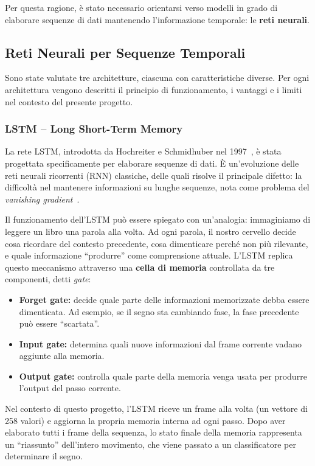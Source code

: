 Per questa ragione, è stato necessario orientarsi verso modelli in grado di elaborare sequenze di dati mantenendo l'informazione temporale: le \textbf{reti neurali}.

\subsection{Reti Neurali per Sequenze Temporali}

Sono state valutate tre architetture, ciascuna con caratteristiche diverse. Per ogni architettura vengono descritti il principio di funzionamento, i vantaggi e i limiti nel contesto del presente progetto.

\subsubsection{LSTM -- Long Short-Term Memory}

La rete LSTM, introdotta da Hochreiter e Schmidhuber nel 1997~\cite{hochreiter1997lstm}, è stata progettata specificamente per elaborare sequenze di dati. È un'evoluzione delle reti neurali ricorrenti (RNN) classiche, delle quali risolve il principale difetto: la difficoltà nel mantenere informazioni su lunghe sequenze, nota come problema del \textit{vanishing gradient}~\cite{lecun2015deeplearning}.

Il funzionamento dell'LSTM può essere spiegato con un'analogia: immaginiamo di leggere un libro una parola alla volta. Ad ogni parola, il nostro cervello decide cosa ricordare del contesto precedente, cosa dimenticare perché non più rilevante, e quale informazione ``produrre'' come comprensione attuale. L'LSTM replica questo meccanismo attraverso una \textbf{cella di memoria} controllata da tre componenti, detti \textit{gate}:

\begin{itemize}
    \item \textbf{Forget gate:} decide quale parte delle informazioni memorizzate debba essere dimenticata. Ad esempio, se il segno sta cambiando fase, la fase precedente può essere ``scartata''.
    \item \textbf{Input gate:} determina quali nuove informazioni dal frame corrente vadano aggiunte alla memoria.
    \item \textbf{Output gate:} controlla quale parte della memoria venga usata per produrre l'output del passo corrente.
\end{itemize}

Nel contesto di questo progetto, l'LSTM riceve un frame alla volta (un vettore di 258 valori) e aggiorna la propria memoria interna ad ogni passo. Dopo aver elaborato tutti i frame della sequenza, lo stato finale della memoria rappresenta un ``riassunto'' dell'intero movimento, che viene passato a un classificatore per determinare il segno.

